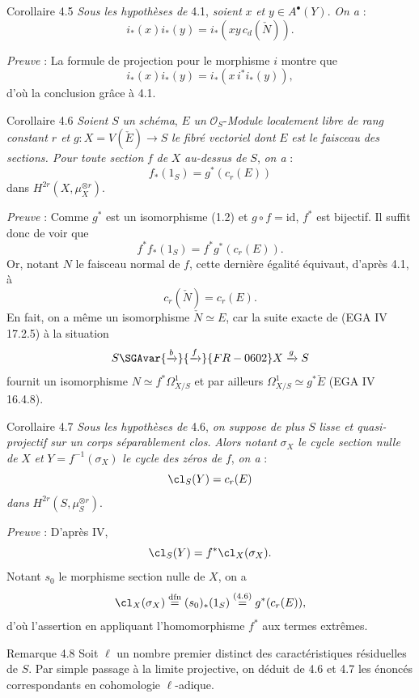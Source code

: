 \begin{statement}{Corollaire 4.5}
\emph{Sous les hypothèses de} 4.1, \emph{soient} $x$ \emph{et} $y\in A^\bullet(Y)$. \emph{On a} :
\[
i_*(x)i_*(y)=i_*(xy\,c_d(\check N)).
\]
\end{statement}

\emph{Preuve} : La formule de projection pour le morphisme $i$ montre que
\[
i_*(x)i_*(y)=i_*(x\,i^*i_*(y)),
\]
d'où la conclusion grâce à 4.1.

\begin{statement}{Corollaire 4.6}
\emph{Soient} $S$ \emph{un} \emph{schéma}, $E$ \emph{un} $\mathcal{O}_S$-\emph{Module localement libre de rang constant $r$ et} $g:X=V(\check E)\to S$ \emph{le fibré vectoriel dont} $E$ \emph{est le faisceau des sections. Pour toute section} $f$ \emph{de} $X$ \emph{au-dessus de} $S$, \emph{on a} :
\[
f_*(1_S)=g^*(c_r(E))
\]
dans $H^{2r}(X,\mu_X^{\otimes r})$.
\end{statement}

\emph{Preuve} : Comme $g^*$ est un isomorphisme (1.2) et $g\circ f=\mathrm{id}$, $f^*$ est bijectif. Il suffit donc de voir que
\[
f^*f_*(1_S)=f^*g^*(c_r(E)).
\]
Or, notant $N$ le faisceau normal de $f$, cette dernière égalité équivaut, d'après 4.1, à
\[
c_r(\check N)=c_r(E).
\]
En fait, on a même un isomorphisme $\check N\simeq E$, car la suite exacte de (EGA IV 17.2.5)  à la situation
\[
S\SGAvar{\xrightarrow{b}}{\xrightarrow{f}}{FR-0602} X\xrightarrow{g} S
\]
fournit un isomorphisme $N\simeq f^*\Omega^1_{X/S}$ et par ailleurs $\Omega^1_{X/S}\simeq g^*\check E$ (EGA IV 16.4.8).

\begin{statement}{Corollaire 4.7}
\emph{Sous les hypothèses de} 4.6, \emph{on suppose de plus} $S$ \emph{lisse et quasi-projectif sur un corps séparablement clos.} \emph{Alors notant} $\sigma_X$ \emph{le cycle section nulle de} $X$ \emph{et} $Y=f^{-1}(\sigma_X)$ \emph{le cycle des zéros de} $f$, \emph{on a} :
\[
\cl_S(Y)=c_r(E)
\]
\emph{dans} $H^{2r}(S,\mu_S^{\otimes r})$.
\end{statement}

\emph{Preuve} : D'après IV,
\[
\cl_S(Y)=f^*\cl_X(\sigma_X).
\]
Notant $s_0$ le morphisme section nulle de $X$, on a
\[
\cl_X(\sigma_X)\stackrel{\mathrm{dfn}}{=}(s_0)_*(1_S)\stackrel{(4.6)}{=}g^*(c_r(E)),
\]
d'où l'assertion en appliquant l'homomorphisme $f^*$ aux termes extrêmes.

\begin{statement}{Remarque 4.8}
Soit $\ell$ un nombre premier distinct des caractéristiques résiduelles de $S$. Par simple passage à la limite projective, on déduit de 4.6 et 4.7 les énoncés correspondants en cohomologie $\ell$-adique.
\end{statement}


